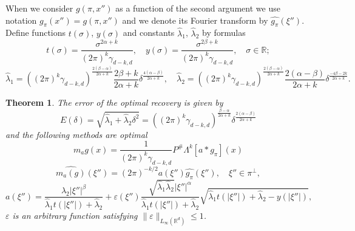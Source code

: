 \documentclass[12pt]{iopart}
\newtheorem{theorem}{Theorem}
\begin{document}
When we consider $g(\pi,x'')$ as a function of the second argument we use notation $g_\pi(x'')=g(\pi,x'')$ and we denote its Fourier transform by $\widehat{g_\pi }(\xi'').$ Define functions $t(\sigma)$, $y(\sigma)$ and constants $\widehat\lambda_1$, $\widehat\lambda_2$ by formulas
  \begin{equation}
  \label{xy}
  t(\sigma)=\frac{\sigma^{2\alpha+k}}{(2\pi)^{k}\gamma_{d-k,d}},\quad
  y(\sigma)=\frac{\sigma^{2\beta+k}}{(2\pi)^{k}\gamma_{d-k,d}},\quad \sigma\in\mathbb R;
  \end{equation}
  \begin{equation}
    \label{lambda}
    \widehat\lambda_1=((2\pi)^k\gamma_{d-k,d})^{\frac{2(\beta-\alpha)}{2\alpha+k}}\frac{2\beta+k}{2\alpha+k}\delta^\frac{4(\alpha-\beta)}{2\alpha+k},\quad \widehat\lambda_2=((2\pi)^k\gamma_{d-k,d})^{\frac{2(\beta-\alpha)}{2\alpha+k}}\frac{2(\alpha-\beta)}{2\alpha+k}\delta^\frac{-4\beta-2k}{2\alpha+k}. 
  \end{equation}

\begin{theorem}
\label{theorem}
The error of the optimal recovery is given by
  \[
E(\delta)=\sqrt{\widehat\lambda_1+\widehat\lambda_2\delta^2}=((2\pi)^k\gamma_{d-k,d})^{\frac{\beta-\alpha}{2\alpha+k}}\delta^{\frac{2(\alpha-\beta)}{2\alpha+k}}
\]
and the following methods are optimal
	\begin{equation}
	m_ag(x) = \frac{1}{(2\pi)^k\gamma_{d-k,d}}P^\#\Lambda^k[a*g_\pi](x)
	\end{equation}	
 \begin{equation}
\label{method}
  \widehat{m_a(g)}(\xi'')=(2\pi)^{-k/2}a(\xi'')\widehat{g_\pi }(\xi''),\quad \xi''\in\pi^\perp,
\end{equation}
  \begin{equation}
  \label{a}
  a(\xi'')=\frac{\widehat\lambda_2|\xi''|^\beta}{\widehat\lambda_1t(|\xi''|)+\widehat\lambda_2}+\varepsilon(\xi'')\frac{\sqrt{\widehat\lambda_1\widehat\lambda_2}|\xi''|^\alpha}{\widehat\lambda_1t(|\xi''|)+\widehat\lambda_2}\sqrt{\widehat\lambda_1t(|\xi''|)+\widehat\lambda_2-y(|\xi''|)},
  \end{equation}
  $\varepsilon$ is an arbitrary function satisfying $\|\varepsilon\|_{L_\infty(\mathbb R^d)}\le 1$.
\end{theorem}
\end{document}
